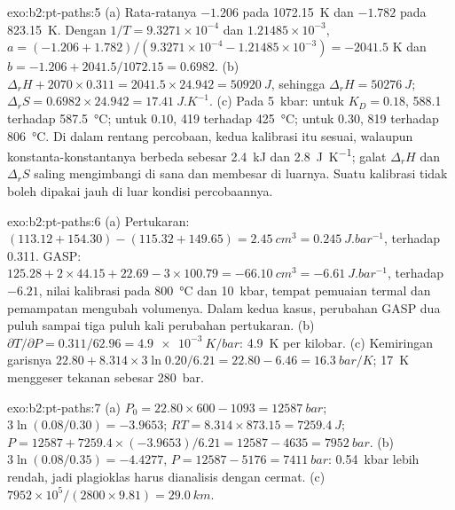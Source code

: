 \begin{solution}{exo:b2:pt-paths:5}
(a) Rata-ratanya $-1.206$ pada \qty{1072.15}{K} dan $-1.782$ pada \qty{823.15}{K}. Dengan $1/T =
9.3271\times10^{-4}$ dan $1.21485\times10^{-3}$, $a = (-1.206 + 1.782)/(9.3271\times10^{-4}
- 1.21485\times10^{-3}) = -2041.5$ K dan $b = -1.206 + 2041.5/1072.15 = 0.6982$.
(b) $\Delta_r H + 2070\times0.311 = 2041.5\times24.942 = \qty{50920}{J}$, sehingga $\Delta_r H =
\qty{50276}{J}$; $\Delta_r S = 0.6982\times24.942 = \qty{17.41}{J.K^{-1}}$. (c) Pada
\qty{5}{kbar}: untuk $K_D = 0.18$, 588.1 terhadap \qty{587.5}{\celsius}; untuk $0.10$, 419
terhadap \qty{425}{\celsius}; untuk $0.30$, 819 terhadap \qty{806}{\celsius}. Di dalam rentang
percobaan, kedua kalibrasi itu sesuai, walaupun konstanta-konstantanya berbeda sebesar
\qty{2.4}{kJ} dan \qty{2.8}{J.K^{-1}}; galat $\Delta_r H$ dan $\Delta_r S$
saling mengimbangi di sana dan membesar di luarnya. Suatu kalibrasi tidak boleh dipakai jauh
di luar kondisi percobaannya.
\end{solution}

\begin{solution}{exo:b2:pt-paths:6}
(a) Pertukaran: $(113.12 + 154.30) - (115.32 + 149.65) = \qty{+2.45}{cm^3} =
\qty{0.245}{J.bar^{-1}}$, terhadap 0.311. GASP: $125.28 + 2\times44.15 + 22.69 -
3\times100.79 = \qty{-66.10}{cm^3} = \qty{-6.61}{J.bar^{-1}}$, terhadap $-6.21$, nilai
kalibrasi pada \qty{800}{\celsius} dan \qty{10}{kbar}, tempat pemuaian termal dan
pemampatan mengubah volumenya. Dalam kedua kasus, perubahan GASP dua puluh sampai tiga puluh kali
perubahan pertukaran. (b) $\partial T/\partial P = 0.311/62.96 = \qty{4.9e-3}{K/bar}$:
\qty{4.9}{K} per kilobar. (c) Kemiringan garisnya $22.80 + 8.314\times3\ln 0.20/6.21
= 22.80 - 6.46 = \qty{16.3}{bar/K}$; \qty{17}{K} menggeser tekanan sebesar
\qty{280}{bar}.
\end{solution}

\begin{solution}{exo:b2:pt-paths:7}
(a) $P_0 = 22.80\times600 - 1093 = \qty{12587}{bar}$; $3\ln(0.08/0.30) = -3.9653$; $RT =
8.314\times873.15 = \qty{7259.4}{J}$; $P = 12587 + 7259.4\times(-3.9653)/6.21 = 12587 -
4635 = \qty{7952}{bar}$. (b) $3\ln(0.08/0.35) = -4.4277$, $P = 12587 - 5176 =
\qty{7411}{bar}$: \qty{0.54}{kbar} lebih rendah, jadi plagioklas harus dianalisis dengan cermat.
(c) $7952\times10^5/(2800\times9.81) = \qty{29.0}{km}$.
\end{solution}

